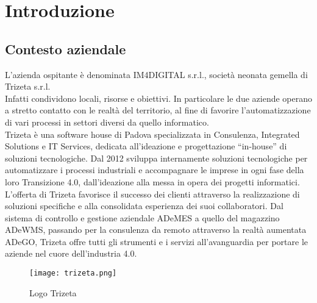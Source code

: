 
\chapter{Introduzione}
\label{cap:introduzione}



\section{Contesto aziendale}

L'azienda ospitante è denominata IM4DIGITAL s.r.l., società neonata gemella di Trizeta s.r.l.\\
Infatti condividono locali, risorse e obiettivi. In particolare le due aziende operano a stretto contatto con le realtà del territorio,
al fine di favorire l'automatizzazione di vari processi in settori diversi da quello informatico.\\
Trizeta è una software house di Padova specializzata in Consulenza, Integrated Solutions e IT Services, dedicata all’ideazione e progettazione “in-house” di soluzioni tecnologiche. Dal 2012 sviluppa internamente soluzioni tecnologiche per automatizzare i processi industriali e accompagnare le imprese in ogni fase della loro Transizione 4.0, dall’ideazione alla messa in opera dei progetti informatici.
L’offerta di Trizeta favorisce il successo dei clienti attraverso la realizzazione di soluzioni specifiche e alla consolidata esperienza dei suoi collaboratori.
Dal sistema di controllo e gestione aziendale ADeMES a quello del magazzino ADeWMS, passando per la consulenza da remoto attraverso la realtà aumentata ADeGO, Trizeta offre tutti gli strumenti e i servizi all’avanguardia per portare le aziende nel cuore dell’industria 4.0.

\begin{figure}[!h]
	\centering 
	\texttt{[image: trizeta.png]}
	\caption{Logo Trizeta}
\end{figure}

